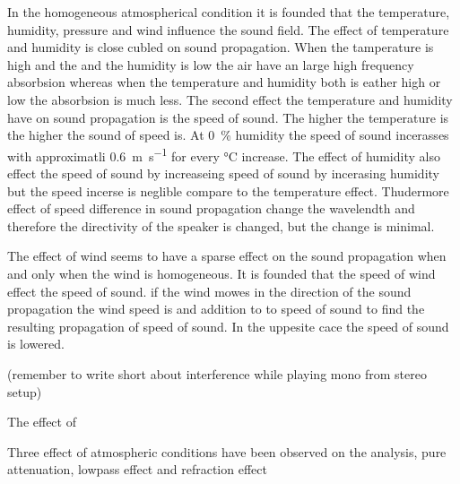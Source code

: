 In the homogeneous atmospherical condition it is founded that the temperature, humidity, pressure and wind influence the sound field. The effect of temperature and humidity is close cubled on sound propagation. When the tamperature is high and the and the humidity is low the air have an large high frequency absorbsion whereas when the temperature and humidity both is eather high or low the  absorbsion is much less. The second effect the temperature and humidity have on sound propagation is the speed of sound. The higher the temperature is the higher the sound of speed is. At \SI{0}{\percent} humidity the speed of sound incerasses with approximatli \SI{0.6}{\meter\per\second} for every \si{\celsius} increase. The effect of humidity also effect the speed of sound by increaseing speed of sound by incerasing humidity but the speed incerse is neglible compare to the temperature effect. Thudermore effect of speed difference in sound propagation change the wavelendth and therefore the directivity of the speaker is changed, but the change is minimal. 

The effect of wind seems to have a sparse effect on the sound propagation when and only when the wind is homogeneous. It is founded that the speed of wind effect the speed of sound. if the wind mowes in the direction of the sound propagation the wind speed is and addition to to speed of sound to find the resulting propagation of speed of sound. In the uppesite cace the speed of sound is lowered.  
 
  

(remember to write short about interference while playing mono from stereo setup)    


The effect of 

Three effect of atmospheric conditions have been observed on the analysis, pure attenuation, lowpass effect and refraction effect
